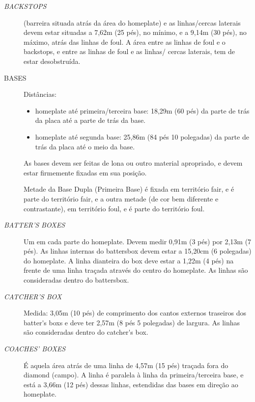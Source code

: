 \begin{description}

 \item[\textit{BACKSTOPS}] (barreira situada atrás da área do \gls{homeplate}) e as linhas/cercas laterais devem estar situadas a 7,62m (25 pés), no mínimo, e a 9,14m (30 pés), no máximo, atrás das linhas de \gls{foul}.
 A área entre as linhas de \gls{foul} e o \glspl{backstop}, e entre as linhas de \gls{foul} e as linhas/ cercas laterais, tem de estar  desobstruída.

\item [BASES]
 Distâncias:
 \begin{itemize}
 	\item  \gls{homeplate} até primeira/terceira base: 18,29m (60 pés) da parte de trás da placa até a parte de trás da base.
 	\item \gls{homeplate} até segunda base: 25,86m (84 pés 10 \textonequarter{}  polegadas) da parte de trás da placa até o meio da base.

 \end{itemize}

 As bases devem ser feitas de lona ou outro material apropriado, e devem estar firmemente fixadas em sua posição.

 Metade da Base Dupla (Primeira Base) é fixada em território \gls{fair}, e é parte do território \gls{fair}, e a outra metade (de cor bem diferente e contrastante), em território \gls{foul}, e é parte do território \gls{foul}.

\item [\textit{BATTER'S BOXES}]
 Um em cada parte do \gls{homeplate}. Devem medir 0,91m (3 pés) por 2,13m (7 pés). As linhas internas do \gls{battersbox} devem estar a 15,20cm (6 polegadas)
 do \gls{homeplate}. A linha dianteira do \gls{box} deve estar a 1,22m (4 pés) na frente de uma linha traçada através do centro do \gls{homeplate}. As linhas são consideradas dentro do \gls{battersbox}.


\item [\textit{CATCHER'S BOX}]
 Medida: 3,05m (10 pés) de comprimento dos cantos externos traseiros dos \glspl{batter's box} e deve ter 2,57m (8 pés 5 polegadas) de largura. As linhas são consideradas dentro do \gls{catcher's box}.

\item [\textit{COACHES' BOXES}]
 É aquela área atrás de uma linha de 4,57m (15 pés) traçada fora do \gls{diamond} (campo). A linha é paralela à linha da primeira/terceira base, e está a 3,66m (12 pés) dessas linhas, estendidas das bases em direção ao \gls{homeplate}.


\end{description}
